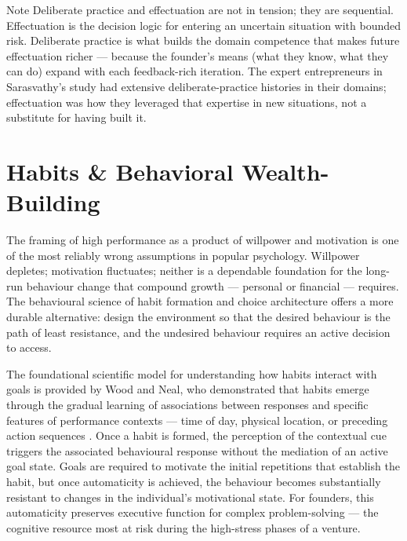 \begin{admonition}{Note}
Deliberate practice and effectuation are not in tension; they are sequential. Effectuation is
the decision logic for entering an uncertain situation with bounded risk. Deliberate practice is
what builds the domain competence that makes future effectuation richer --- because the founder's
means (what they know, what they can do) expand with each feedback-rich iteration. The expert
entrepreneurs in Sarasvathy's study had extensive deliberate-practice histories in their domains;
effectuation was how they leveraged that expertise in new situations, not a substitute for having
built it.
\end{admonition}

\section{Habits \& Behavioral Wealth-Building}\label{sec:habits-wealth}

The framing of high performance as a product of willpower and motivation is one of the most
reliably wrong assumptions in popular psychology. Willpower depletes; motivation fluctuates;
neither is a dependable foundation for the long-run behaviour change that compound growth ---
personal or financial --- requires. The behavioural science of habit formation and choice
architecture offers a more durable alternative: design the environment so that the desired
behaviour is the path of least resistance, and the undesired behaviour requires an active
decision to access.

The foundational scientific model for understanding how habits interact with goals is provided by
Wood and Neal, who demonstrated that habits emerge through the gradual learning of associations
between responses and specific features of performance contexts --- time of day, physical location,
or preceding action sequences \parencite{wood2007habits}. Once a habit is formed, the perception
of the contextual cue triggers the associated behavioural response without the mediation of an
active goal state. Goals are required to motivate the initial repetitions that establish the
habit, but once automaticity is achieved, the behaviour becomes substantially resistant to
changes in the individual's motivational state. For founders, this automaticity preserves
executive function for complex problem-solving --- the cognitive resource most at risk during the
high-stress phases of a venture.

